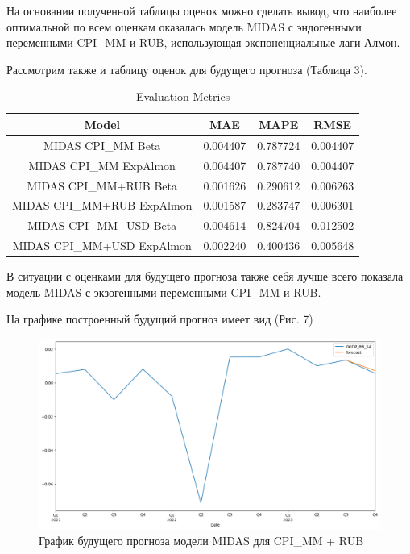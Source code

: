 \documentclass[a4paper, 12pt]{extarticle}
\numberwithin{equation}{subsection}
\begin{document}
	На основании полученной таблицы оценок можно сделать вывод, что наиболее оптимальной по всем оценкам оказалась модель MIDAS с эндогенными переменными CPI\_MM и RUB, использующая экспоненциальные лаги Алмон.
	
	Рассмотрим также и таблицу оценок для будущего прогноза (Таблица 3).
	
	\begin{table}[htbp]
		\centering
		\caption{Evaluation Metrics}
		\label{tab:evaluation_metrics}
		\begin{tabular}{|c|c|c|c|}
			\hline
			Model & MAE & MAPE & RMSE \\
			\hline
			MIDAS CPI\_MM Beta          & 0.004407 & 0.787724 & 0.004407 \\
			MIDAS CPI\_MM ExpAlmon      & 0.004407 & 0.787740 & 0.004407 \\
			MIDAS CPI\_MM+RUB Beta      & 0.001626 & 0.290612 & 0.006263 \\
			MIDAS CPI\_MM+RUB ExpAlmon  & 0.001587 & 0.283747 & 0.006301 \\
			MIDAS CPI\_MM+USD Beta      & 0.004614 & 0.824704 & 0.012502 \\
			MIDAS CPI\_MM+USD ExpAlmon  & 0.002240 & 0.400436 & 0.005648 \\
			\hline
		\end{tabular}
	\end{table}
	
	В ситуации с оценками для будущего прогноза также себя лучше всего показала модель MIDAS с экзогенными переменными CPI\_MM и RUB.
	
	На графике построенный будущий прогноз имеет вид (Рис. 7)
	\begin{figure}[h]
		\centering
		\includegraphics[scale=0.5]{images/img07}
		\caption{График будущего прогноза модели MIDAS для CPI\_MM + RUB}
		\label{fig:img07}
	\end{figure}
	
\end{document}
